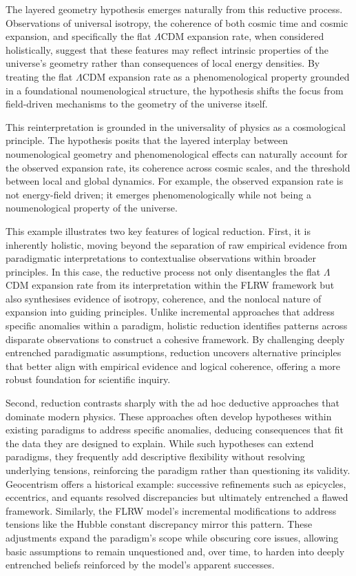 \documentclass[aps,rmp,groupedaddress,twocolumn,10pt]{revtex4-2}
\begin{document}
The layered geometry hypothesis emerges naturally from this reductive process. Observations of universal isotropy, the coherence of both cosmic time and cosmic expansion, and specifically the flat $\Lambda$CDM expansion rate, when considered holistically, suggest that these features may reflect intrinsic properties of the universe's geometry rather than consequences of local energy densities. By treating the flat $\Lambda$CDM expansion rate as a phenomenological property grounded in a foundational noumenological structure, the hypothesis shifts the focus from field-driven mechanisms to the geometry of the universe itself.

This reinterpretation is grounded in the universality of physics as a cosmological principle. The hypothesis posits that the layered interplay between noumenological geometry and phenomenological effects can naturally account for the observed expansion rate, its coherence across cosmic scales, and the threshold between local and global dynamics. For example, the observed expansion rate is not energy-field driven; it emerges phenomenologically while not being a noumenological property of the universe.

This example illustrates two key features of logical reduction. First, it is inherently holistic, moving beyond the separation of raw empirical evidence from paradigmatic interpretations to contextualise observations within broader principles. In this case, the reductive process not only disentangles the flat $\Lambda$CDM expansion rate from its interpretation within the FLRW framework but also synthesises evidence of isotropy, coherence, and the nonlocal nature of expansion into guiding principles. Unlike incremental approaches that address specific anomalies within a paradigm, holistic reduction identifies patterns across disparate observations to construct a cohesive framework. By challenging deeply entrenched paradigmatic assumptions, reduction uncovers alternative principles that better align with empirical evidence and logical coherence, offering a more robust foundation for scientific inquiry.

Second, reduction contrasts sharply with the ad hoc deductive approaches that dominate modern physics. These approaches often develop hypotheses within existing paradigms to address specific anomalies, deducing consequences that fit the data they are designed to explain. While such hypotheses can extend paradigms, they frequently add descriptive flexibility without resolving underlying tensions, reinforcing the paradigm rather than questioning its validity. Geocentrism offers a historical example: successive refinements such as epicycles, eccentrics, and equants resolved discrepancies but ultimately entrenched a flawed framework. Similarly, the FLRW model's incremental modifications to address tensions like the Hubble constant discrepancy mirror this pattern. These adjustments expand the paradigm's scope while obscuring core issues, allowing basic assumptions to remain unquestioned and, over time, to harden into deeply entrenched beliefs reinforced by the model's apparent successes.
\end{document}
